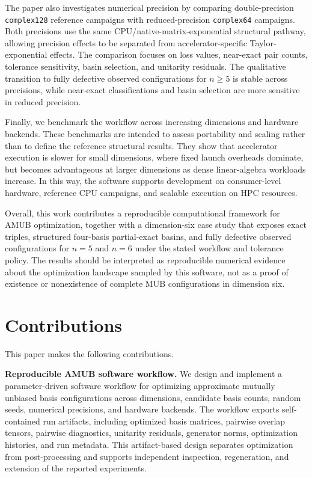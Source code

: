 \documentclass[a4paper,twocolumn,11pt,amsfonts,amssymb]{quantumarticle}
\begin{document}
The paper also investigates numerical precision by comparing double-precision \texttt{complex128} reference campaigns with reduced-precision \texttt{complex64} campaigns. Both precisions use the same CPU/native-matrix-exponential structural pathway, allowing precision effects to be separated from accelerator-specific Taylor-exponential effects. The comparison focuses on loss values, near-exact pair counts, tolerance sensitivity, basin selection, and unitarity residuals. The qualitative transition to fully defective observed configurations for \(n\geq 5\) is stable across precisions, while near-exact classifications and basin selection are more sensitive in reduced precision.

Finally, we benchmark the workflow across increasing dimensions and hardware backends. These benchmarks are intended to assess portability and scaling rather than to define the reference structural results. They show that accelerator execution is slower for small dimensions, where fixed launch overheads dominate, but becomes advantageous at larger dimensions as dense linear-algebra workloads increase. In this way, the software supports development on consumer-level hardware, reference CPU campaigns, and scalable execution on HPC resources.

Overall, this work contributes a reproducible computational framework for AMUB optimization, together with a dimension-six case study that exposes exact triples, structured four-basis partial-exact basins, and fully defective observed configurations for \(n=5\) and \(n=6\) under the stated workflow and tolerance policy. The results should be interpreted as reproducible numerical evidence about the optimization landscape sampled by this software, not as a proof of existence or nonexistence of complete MUB configurations in dimension six.

\section{Contributions}

This paper makes the following contributions.

\textbf{Reproducible AMUB software workflow.}
We design and implement a parameter-driven software workflow for optimizing approximate mutually unbiased basis configurations across dimensions, candidate basis counts, random seeds, numerical precisions, and hardware backends. The workflow exports self-contained run artifacts, including optimized basis matrices, pairwise overlap tensors, pairwise diagnostics, unitarity residuals, generator norms, optimization histories, and run metadata. This artifact-based design separates optimization from post-processing and supports independent inspection, regeneration, and extension of the reported experiments.
\end{document}
